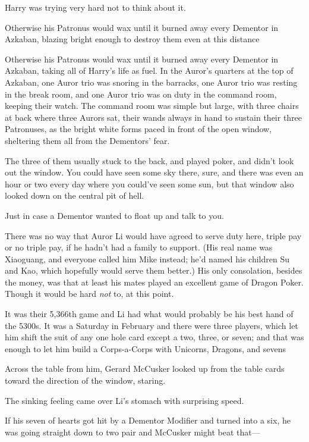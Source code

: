 Harry was trying very hard not to think about it.

Otherwise his Patronus would wax until it burned away every Dementor in
Azkaban, blazing bright enough to destroy them even at this distance{\el}

Otherwise his Patronus would wax until it burned away every Dementor in
Azkaban, taking all of Harry's life as fuel.
\sbreak
In the Auror's quarters at the top of Azkaban, one Auror trio was snoring in
the barracks, one Auror trio was resting in the break room, and one Auror trio
was on duty in the command room, keeping their watch. The command room was
simple but large, with three chairs at back where three Aurors sat, their wands
always in hand to sustain their three Patronuses, as the bright white forms
paced in front of the open window, sheltering them all from the Dementors' fear.

The three of them usually stuck to the back, and played poker, and didn't look
out the window. You could have seen some sky there, sure, and there was even an
hour or two every day where you could've seen some sun, but that window also
looked down on the central pit of hell.

Just in case a Dementor wanted to float up and talk to you.

There was no way that Auror Li would have agreed to serve duty here, triple pay
or no triple pay, if he hadn't had a family to support. (His real name was
Xiaoguang, and everyone called him Mike instead; he'd named his children Su and
Kao, which hopefully would serve them better.) His only consolation, besides
the money, was that at least his mates played an excellent game of Dragon
Poker. Though it would be hard \emph{not} to, at this point.

It was their 5,366th game and Li had what would probably be his best hand of
the 5300s. It was a Saturday in February and there were three players, which
let him shift the suit of any one hole card except a two, three, or seven; and
that was enough to let him build a Corps-a-Corps with Unicorns, Dragons, and
sevens{\el}

Across the table from him, Gerard McCusker looked up from the table cards
toward the direction of the window, staring.

The sinking feeling came over Li's stomach with surprising speed.

If his seven of hearts got hit by a Dementor Modifier and turned into a six, he
was going straight down to two pair and McCusker might beat that---

